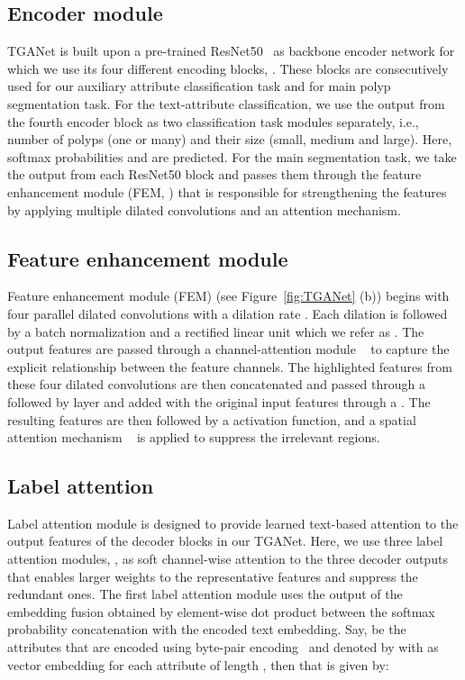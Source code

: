 \documentclass[runningheads]{llncs}
\begin{document}
\subsection{Encoder module}
TGANet is built upon a pre-trained ResNet50~\cite{he2016deep} as backbone encoder network for which we use its four different encoding blocks,  . These blocks are consecutively used for our auxiliary attribute classification task and for main polyp segmentation task. For the text-attribute classification, we use the output from the fourth encoder block as two classification task modules separately, i.e., number of polyps (one or many) and their size (small, medium and large). Here, softmax probabilities  and  are predicted. For the main segmentation task, we take the output from each ResNet50 block and passes them through the feature enhancement module (FEM,  ) that is responsible for strengthening the features by applying multiple dilated convolutions and an attention mechanism.

\subsection{Feature enhancement module}
Feature enhancement module (FEM) (see Figure~\ref{fig:TGANet} (b)) begins with four parallel dilated convolutions  with a dilation rate . Each dilation is followed by a batch normalization  and a rectified linear unit  which we refer as . The output features are passed through a channel-attention module ~\cite{woo2018cbam} to capture the explicit relationship between the feature channels. The highlighted features from these four dilated convolutions are then concatenated and passed through a  followed by  layer and added with the original input features through a . The resulting features are then followed by a  activation function, and a spatial attention mechanism ~\cite{woo2018cbam} is applied to suppress the irrelevant regions. 


\subsection{Label attention}
Label attention module is designed to provide learned text-based attention to the output features of the decoder blocks in our TGANet. Here, we use three label attention modules, , as soft channel-wise attention to the three decoder outputs that enables larger weights to the representative features and suppress the redundant ones. The first label attention module uses the output of the embedding fusion  obtained by element-wise dot product between the softmax probability concatenation  with the encoded text embedding. Say,  be the attributes that are encoded using byte-pair encoding~\cite{heinzerling2018bpemb} and denoted by  with  as vector embedding for each attribute  of length , then  that is given by:
\end{document}
